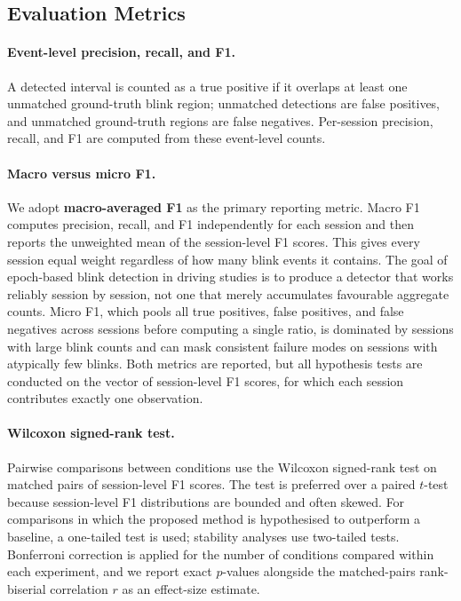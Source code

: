 \subsection{Evaluation Metrics}
\label{sec:metrics}

\paragraph{Event-level precision, recall, and F1.}
A detected interval is counted as a true positive if it overlaps at least one
unmatched ground-truth blink region; unmatched detections are false positives,
and unmatched ground-truth regions are false negatives.
Per-session precision, recall, and F1 are computed from these event-level counts.

\paragraph{Macro versus micro F1.}
We adopt \textbf{macro-averaged F1} as the primary reporting metric.
Macro F1 computes precision, recall, and F1 independently for each session and
then reports the unweighted mean of the session-level F1 scores.
This gives every session equal weight regardless of how many blink events it
contains. The goal of epoch-based blink detection in driving studies is to produce
a detector that works reliably session by session, not one that merely accumulates
favourable aggregate counts. Micro F1, which pools all true positives, false
positives, and false negatives across sessions before computing a single ratio,
is dominated by sessions with large blink counts and can mask consistent failure
modes on sessions with atypically few blinks. Both metrics are reported, but all
hypothesis tests are conducted on the vector of session-level F1 scores, for
which each session contributes exactly one observation.

\paragraph{Wilcoxon signed-rank test.}
Pairwise comparisons between conditions use the Wilcoxon signed-rank test on
matched pairs of session-level F1 scores.
The test is preferred over a paired $t$-test because session-level F1
distributions are bounded and often skewed.
For comparisons in which the proposed method is hypothesised to outperform a
baseline, a one-tailed test is used; stability analyses use two-tailed tests.
Bonferroni correction is applied for the number of conditions compared within
each experiment, and we report exact $p$-values alongside the matched-pairs
rank-biserial correlation $r$ as an effect-size estimate.

